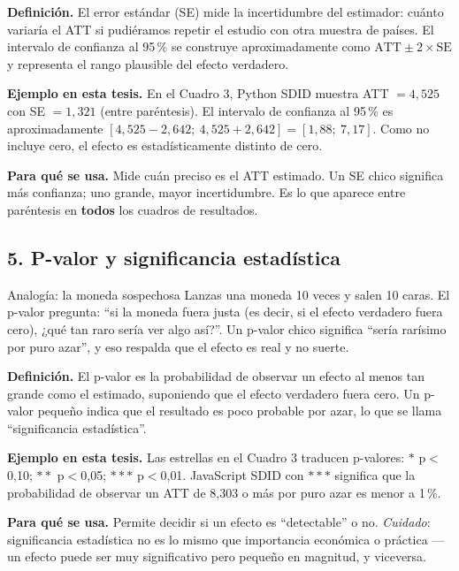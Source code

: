 \documentclass[11pt,a4paper]{article}
\begin{document}
\textbf{Definición.} El error estándar (SE) mide la incertidumbre del estimador: cuánto variaría el ATT si pudiéramos repetir el estudio con otra muestra de países. El intervalo de confianza al 95\,\% se construye aproximadamente como $\text{ATT} \pm 2 \times \text{SE}$ y representa el rango plausible del efecto verdadero.

\textbf{Ejemplo en esta tesis.} En el Cuadro 3, Python SDID muestra ATT $= 4{,}525$ con SE $= 1{,}321$ (entre paréntesis). El intervalo de confianza al 95\,\% es aproximadamente $[4{,}525 - 2{,}642;\ 4{,}525 + 2{,}642] = [1{,}88;\ 7{,}17]$. Como no incluye cero, el efecto es estadísticamente distinto de cero.

\textbf{Para qué se usa.} Mide cuán preciso es el ATT estimado. Un SE chico significa más confianza; uno grande, mayor incertidumbre. Es lo que aparece entre paréntesis en \textbf{todos} los cuadros de resultados.

\subsection*{5. P-valor y significancia estadística}

\begin{ideabox}{Analogía: la moneda sospechosa}
Lanzas una moneda 10 veces y salen 10 caras. El p-valor pregunta: ``si la moneda fuera justa (es decir, si el efecto verdadero fuera cero), ¿qué tan raro sería ver algo así?''. Un p-valor chico significa ``sería rarísimo por puro azar'', y eso respalda que el efecto es real y no suerte.
\end{ideabox}

\textbf{Definición.} El p-valor es la probabilidad de observar un efecto al menos tan grande como el estimado, suponiendo que el efecto verdadero fuera cero. Un p-valor pequeño indica que el resultado es poco probable por azar, lo que se llama ``significancia estadística''.

\textbf{Ejemplo en esta tesis.} Las estrellas en el Cuadro 3 traducen p-valores: $*$ p$<$0{,}10; $**$ p$<$0{,}05; $***$ p$<$0{,}01. JavaScript SDID con $***$ significa que la probabilidad de observar un ATT de 8{,}303 o más por puro azar es menor a 1\,\%.

\textbf{Para qué se usa.} Permite decidir si un efecto es ``detectable'' o no. \textit{Cuidado}: significancia estadística no es lo mismo que importancia económica o práctica ---un efecto puede ser muy significativo pero pequeño en magnitud, y viceversa.
\end{document}

